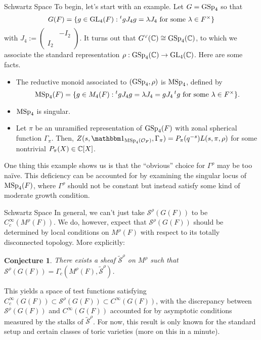 \documentclass[aspectratio=1610]{beamer}
\renewcommand{\S}{\mathscr{S}}
\newtheorem{conjecture}{Conjecture}
\begin{document}
\begin{frame}{Schwartz Space}
\pause To begin, let's start with an example. \pause Let $G=\textup{GSp}_4$ so that 
$$G(F)=\{g\in\textup{GL}_4(F) : \prescript{t}{}gJ_4g=\lambda J_4\textup{ for some }\lambda\in F^{\times}\}$$
with $J_4:=\begin{pmatrix} & -I_2\\ I_2 & \end{pmatrix}$. \pause It turns out that $G^{\vee}(\mathbb{C})\cong\textup{GSp}_4(\mathbb{C})$, to which we associate the standard representation $\rho: \textup{GSp}_4(\mathbb{C})\to\textup{GL}_4(\mathbb{C})$. \pause Here are some facts.
\begin{itemize}
\pause\item The reductive monoid associated to $(\textup{GSp}_4,\rho)$ is $\textup{MSp}_4$, defined by
$$\textup{MSp}_4(F)=\{g\in M_4(F) : \prescript{t}{}gJ_4g=\lambda J_4=gJ_4\prescript{t}{}g\textup{ for some }\lambda\in F^{\times}\}.$$

\pause\item $\textup{MSp}_4$ is singular.

\pause\item Let $\pi$ be an unramified representation of $\textup{GSp}_4(F)$ with zonal spherical function $\Gamma_{\pi}$. \pause Then, $Z(s,\ind_{\MSp_4(\O_F)},\Gamma_{\pi})=P_{\pi}(q^{-s})L(s,\pi,\rho)$ for some nontrivial $P_{\pi}(X)\in\mathbb{C}[X]$.
\end{itemize}
\pause One thing this example shows us is that the ``obvious'' choice for $\Gamma^{\rho}$ may be too na\"{i}ve. \pause This deficiency can be accounted for by examining the singular locus of $\textup{MSp}_4(F)$, where $\Gamma^{\rho}$ should not be constant but instead satisfy some kind of moderate growth condition.
\end{frame}

\begin{frame}{Schwartz Space}
\pause In general, we can't just take $\S^{\rho}(G(F))$ to be $C_c^{\infty}(M^{\rho}(F))$. \pause We do, however, expect that $\S^{\rho}(G(F))$ should be determined by local conditions on $M^{\rho}(F)$ with respect to its totally disconnected topology. \pause More explicitly:

\begin{conjecture}
There exists a sheaf $\widetilde{\S}^{\rho}$ on $M^{\rho}$ such that $\S^{\rho}(G(F))=\Gamma_c(M^{\rho}(F),\widetilde{\S}^{\rho})$.
\end{conjecture}

\pause This yields a space of test functions satisfying $C_c^{\infty}(G(F))\subset\S^{\rho}(G(F))\subset C^{\infty}(G(F))$, with the discrepancy between $\S^{\rho}(G(F))$ and $C^{\infty}(G(F))$ accounted for by asymptotic conditions measured by the stalks of $\widetilde{\S}^{\rho}$. \pause For now, this result is only known for the standard setup and certain classes of toric varieties (more on this in a minute).
\end{frame}
\end{document}
